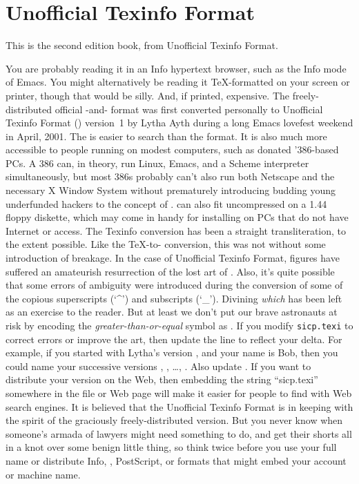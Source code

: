\chapter*{Unofficial Texinfo Format}
\label{UTF}

This is the second edition  book, from Unofficial Texinfo Format.

You are probably reading it in an Info hypertext browser, such as the Info mode of Emacs.
You might alternatively be reading it \TeX{}-formatted on your screen or printer, though that would be silly.
And, if printed, expensive.
The freely-distributed official -and- format was first converted personally to Unofficial Texinfo Format () version~1 by Lytha Ayth during a long Emacs lovefest weekend in April, 2001.
The  is easier to search than the  format.
It is also much more accessible to people running on modest computers, such as donated '386-based PCs.
A 386 can, in theory, run Linux, Emacs, and a Scheme interpreter simultaneously, but most 386s probably can’t also run both Netscape and the necessary X Window System without prematurely introducing budding young underfunded hackers to the concept of .
 can also fit uncompressed on a 1.44 floppy diskette, which may come in handy for installing  on PCs that do not have Internet or  access.
The Texinfo conversion has been a straight transliteration, to the extent possible.
Like the \TeX{}-to- conversion, this was not without some introduction of breakage.
In the case of Unofficial Texinfo Format, figures have suffered an amateurish resurrection of the lost art of .
Also, it’s quite possible that some errors of ambiguity were introduced during the conversion of some of the copious superscripts (‘\^{}’) and subscripts (‘\_’).
Divining \emph{which} has been left as an exercise to the reader.
But at least we don’t put our brave astronauts at risk by encoding the \emph{greater-than-or-equal} symbol as .
If you modify \texttt{sicp.texi} to correct errors or improve the  art, then update the  line to reflect your delta.
For example, if you started with Lytha's version , and your name is Bob, then you could name your successive versions , , …, .
Also update .
If you want to distribute your version on the Web, then embedding the string “sicp.texi” somewhere in the file or Web page will make it easier for people to find with Web search engines.
It is believed that the Unofficial Texinfo Format is in keeping with the spirit of the graciously freely-distributed  version.
But you never know when someone’s armada of lawyers might need something to do, and get their shorts all in a knot over some benign little thing, so think twice before you use your full name or distribute Info, , PostScript, or  formats that might embed your account or machine name.


